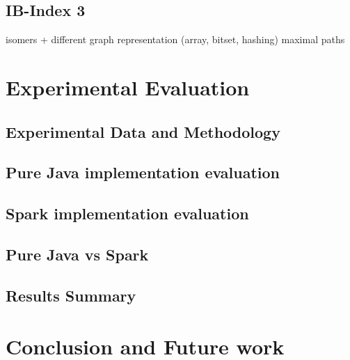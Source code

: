 \documentclass{l4proj}
\theoremstyle{definition}
\begin{document}
        \section{IB-Index 3}
        isomers + different graph representation (array, bitset, hashing)
        maximal paths
        


\chapter{Experimental Evaluation}
    \section{Experimental Data and Methodology}
    \section{Pure Java implementation evaluation}
    \section{Spark implementation evaluation}
    \section{Pure Java vs Spark}
    \section{Results Summary}
    
\chapter{Conclusion and Future work}
\end{document}
